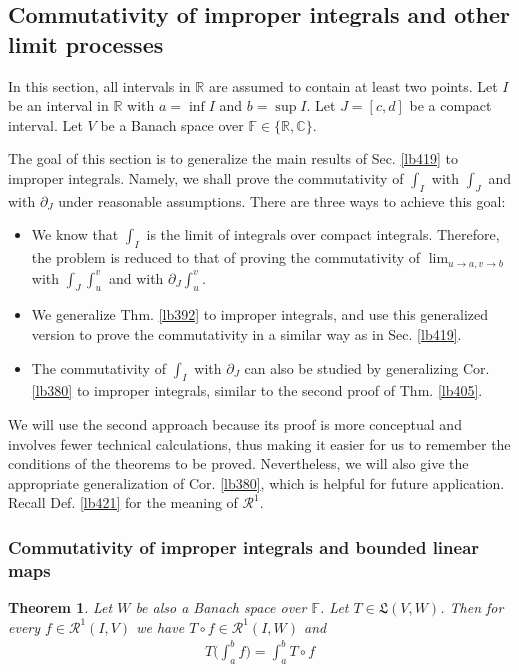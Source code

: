 \documentclass[12pt,b5paper,notitlepage]{article}
\theoremstyle{definition}
\theoremstyle{plain}
\newtheorem{thm}[df]{Theorem}
\newcommand{\fk}{\mathfrak}
\newcommand{\scr}{\mathscr}
\newcommand{\Cbb}{\mathbb C}
\newcommand{\Rbb}{\mathbb R}
\newcommand{\Fbb}{\mathbb F}
\numberwithin{equation}{section}
\begin{document}
\subsection{Commutativity of improper integrals and other limit processes}



In this section, all intervals in $\Rbb$ are assumed to contain at least two points. Let $I$ be an interval in $\Rbb$ with $a=\inf I$ and $b=\sup I$. Let $J=[c,d]$ be a compact interval. Let $V$ be a Banach space over $\Fbb\in\{\Rbb,\Cbb\}$.

The goal of this section is to generalize the main results of Sec. \ref{lb419} to improper integrals. Namely, we shall prove the commutativity of $\int_I$ with $\int_J$ and with $\partial_J$ under reasonable assumptions. There are three ways to achieve this goal: 
\begin{itemize}
\item We know that $\int_I$ is the limit of integrals over compact integrals. Therefore, the problem is reduced to that of proving the commutativity of $\lim_{u\rightarrow a,v\rightarrow b}$ with $\int_J\int_u^v$ and with $\partial_J\int_u^v$.
\item We generalize Thm. \ref{lb392} to improper integrals, and use this generalized version to prove the commutativity in a similar way as in Sec. \ref{lb419}.
\item The commutativity of $\int_I$ with $\partial_J$ can also be studied by generalizing Cor. \ref{lb380} to improper integrals, similar to the second proof of Thm. \ref{lb405}.
\end{itemize}



We will use the second approach because its proof is more conceptual and involves fewer technical calculations, thus making it easier for us to remember the conditions of the theorems to be proved. Nevertheless, we will also give the appropriate generalization of Cor. \ref{lb380}, which is helpful for future application. Recall Def. \ref{lb421} for the meaning of $\scr R^1$. 


\subsubsection{Commutativity of improper integrals and bounded linear maps}



\begin{thm}\label{lb420}
Let $W$ be also a Banach space over $\Fbb$. Let $T\in\fk L(V,W)$. Then for every $f\in\scr R^1(I,V)$ we have $T\circ f\in\scr R^1(I,W)$ and
\begin{align}
T\Big(\int_a^b f \Big)=\int_a^b T\circ f
\end{align}
\end{thm}
\end{document}
